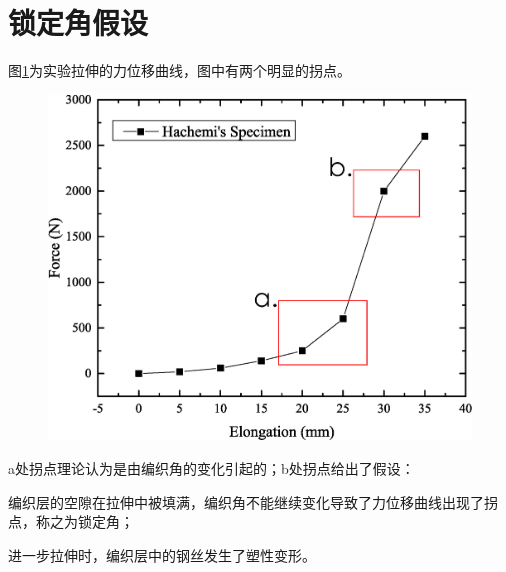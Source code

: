 \newpage


\section{锁定角假设}




图\ref{fig:Hachemi-Result-ex}为\ha 实验拉伸的力位移曲线，图中有两个明显的拐点。
\begin{figure}[!htb]
	\centering
	\includegraphics[height=0.25\textheight]{figure/experiment/Hachemi-Result-ex}
	\label{fig:Hachemi-Result-ex}
\end{figure}
a处拐点理论认为是由编织角的变化引起的；b处拐点给出了假设：
\begin{compactenum}
	\item 编织层的空隙在拉伸中被填满，编织角不能继续变化导致了力位移曲线出现了拐点，称之为锁定角；
	\item 进一步拉伸时，编织层中的钢丝发生了塑性变形。
\end{compactenum}




